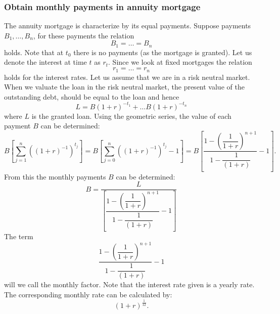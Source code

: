 \subsubsection{Obtain monthly payments in annuity mortgage}
    The annuity mortgage is characterize by its equal payments. 
    Suppose payments $B_1, \ldots, B_n$, for these payments the relation
    \begin{equation}
        B_1 = \ldots = B_n 
    \end{equation}
    holds. Note that at $t_0$ there is no payments (as the mortgage is granted).
    Let us denote the interest at time $t$ as $r_t$. Since we look at fixed mortgages 
    the relation
    \begin{equation}
        r_1 = \ldots = r_n
    \end{equation}
    holds for the interest rates. 
    Let us assume that we are in a risk neutral market. When we valuate the loan in the risk 
    neutral market, the present value of the outstanding debt, should be equal to the loan
    and hence
    \begin{equation}
        L = B (1 + r)^{-t_1} + \ldots B (1 + r)^{-t_n}
    \end{equation}
    where $L$ is the granted loan. Using the geometric series, the value of each payment 
    $B$ can be determined: 
    \begin{equation}
        B\left[
            \displaystyle\sum_{j=1}^{n} \left(
                (1 + r)^{-1}
                \right)^{t_j}  
        \right] = 
        B\left[
            \displaystyle\sum_{j=0}^{n} \left(
                (1 + r)^{-1}
                \right)^{t_j} - 1  
        \right] = 
        B \left[
            \dfrac{
                1 - \left(
                    \dfrac{1}{1 + r}
                \right)^{n+1}
                }
                {
                    1 - \dfrac{1}{(1 + r)}
                } - 1
        \right].
    \end{equation}
    From this the monthly payments $B$ can be determined: 
    \begin{equation}
        B = \dfrac{L}{
                \left[
                    \dfrac{
                        1 - \left(
                            \dfrac{1}{1 + r}
                        \right)^{n+1}
                        }
                        {
                            1 - \dfrac{1}{(1 + r)}
                        } - 1
                \right]        
            }
    \end{equation}
    The term 
    \begin{equation}
        \dfrac{
            1 - \left(
                \dfrac{1}{1 + r}
            \right)^{n+1}
            }
            {
                1 - \dfrac{1}{(1 + r)}
            } - 1
    \end{equation}
    will we call the monthly factor. Note that the interest rate given is a yearly rate. The 
    corresponding monthly rate can be calculated by: 
    \begin{equation}
        (1 + r)^{\frac{1}{12}}.
    \end{equation} 

